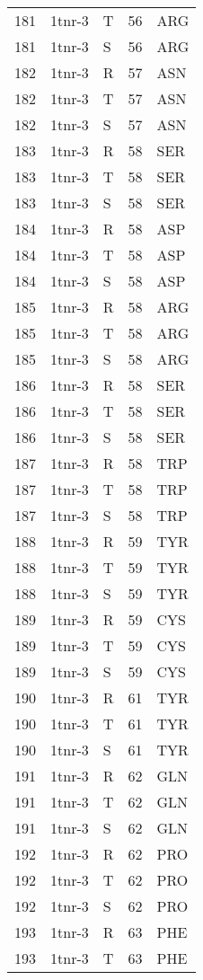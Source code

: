 \begin{longtable}[l]{l|l|l|l|l}
	181 & 1tnr-3 & T & 56 & ARG \\
	181 & 1tnr-3 & S & 56 & ARG \\
	182 & 1tnr-3 & R & 57 & ASN \\
	182 & 1tnr-3 & T & 57 & ASN \\
	182 & 1tnr-3 & S & 57 & ASN \\
	183 & 1tnr-3 & R & 58 & SER \\
	183 & 1tnr-3 & T & 58 & SER \\
	183 & 1tnr-3 & S & 58 & SER \\
	184 & 1tnr-3 & R & 58 & ASP \\
	184 & 1tnr-3 & T & 58 & ASP \\
	184 & 1tnr-3 & S & 58 & ASP \\
	185 & 1tnr-3 & R & 58 & ARG \\
	185 & 1tnr-3 & T & 58 & ARG \\
	185 & 1tnr-3 & S & 58 & ARG \\
	186 & 1tnr-3 & R & 58 & SER \\
	186 & 1tnr-3 & T & 58 & SER \\
	186 & 1tnr-3 & S & 58 & SER \\
	187 & 1tnr-3 & R & 58 & TRP \\
	187 & 1tnr-3 & T & 58 & TRP \\
	187 & 1tnr-3 & S & 58 & TRP \\
	188 & 1tnr-3 & R & 59 & TYR \\
	188 & 1tnr-3 & T & 59 & TYR \\
	188 & 1tnr-3 & S & 59 & TYR \\
	189 & 1tnr-3 & R & 59 & CYS \\
	189 & 1tnr-3 & T & 59 & CYS \\
	189 & 1tnr-3 & S & 59 & CYS \\
	190 & 1tnr-3 & R & 61 & TYR \\
	190 & 1tnr-3 & T & 61 & TYR \\
	190 & 1tnr-3 & S & 61 & TYR \\
	191 & 1tnr-3 & R & 62 & GLN \\
	191 & 1tnr-3 & T & 62 & GLN \\
	191 & 1tnr-3 & S & 62 & GLN \\
	192 & 1tnr-3 & R & 62 & PRO \\
	192 & 1tnr-3 & T & 62 & PRO \\
	192 & 1tnr-3 & S & 62 & PRO \\
	193 & 1tnr-3 & R & 63 & PHE \\
	193 & 1tnr-3 & T & 63 & PHE \\

\end{longtable}
